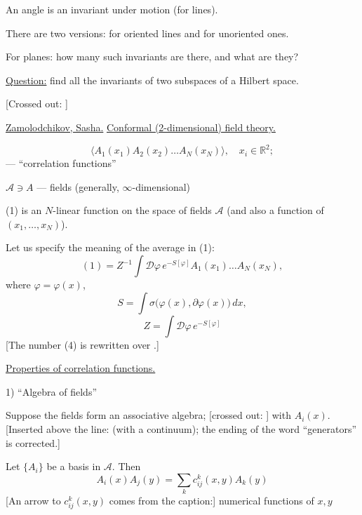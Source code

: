 An angle is an invariant under motion (for lines).

There are two versions: for oriented lines and for unoriented ones.

For planes: how many such invariants are there, and what are they?

\underline{Question:} find all the invariants of two subspaces of a Hilbert space.

[Crossed out: ]

\underline{Zamolodchikov, Sasha.}\qquad
\underline{Conformal (2-dimensional) field theory.}

\begin{equation*}
\langle A_1(x_1)A_2(x_2)\ldots A_N(x_N)\rangle,\quad x_i\in\mathbb{R}^2;
\tag{1}
\end{equation*}
--- ``correlation functions''

$\mathcal A\ni A$ --- fields (generally, $\infty$-dimensional)

(1) is an $N$-linear function on the space of fields $\mathcal A$
(and also a function of $(x_1,\ldots,x_N)$).

Let us specify the meaning of the average in (1):
\begin{equation*}
(1)=Z^{-1}\int\mathcal D\varphi\,e^{-S[\varphi]}A_1(x_1)\ldots A_N(x_N),
\tag{2}
\end{equation*}
where $\varphi=\varphi(x)$,
\begin{equation*}
S=\int\sigma\bigl(\varphi(x),\partial\varphi(x)\bigr)\,dx,
\tag{3}
\end{equation*}
\begin{equation*}
Z=\int\mathcal D\varphi\,e^{-S[\varphi]}
\tag{4}
\end{equation*}
[The number (4) is rewritten over .]

\underline{Properties of correlation functions.}

1) ``Algebra of fields''

Suppose the fields form an associative algebra;
[crossed out: ]
with  $A_i(x)$.
[Inserted above the line: (with a continuum); the ending of the word ``generators'' is corrected.]

Let $\{A_i\}$ be a basis in $\mathcal A$. Then
\begin{equation*}
A_i(x)A_j(y)=\sum_k c_{ij}^k(x,y)A_k(y)
\end{equation*}
[An arrow to $c_{ij}^k(x,y)$ comes from the caption:] numerical functions of $x,y$

